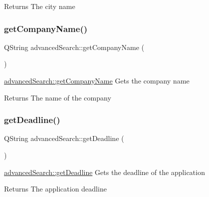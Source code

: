\begin{DoxyReturn}{Returns}
The city name 
\end{DoxyReturn}
\mbox{\label{classadvanced_search_a5e9e9e24e83f36f9ed32bd60cecbb7de}} 
\subsubsection{\texorpdfstring{get\+Company\+Name()}{getCompanyName()}}
{\footnotesize\ttfamily Q\+String advanced\+Search\+::get\+Company\+Name (\begin{DoxyParamCaption}{ }\end{DoxyParamCaption})}



\mbox{\hyperlink{classadvanced_search_a5e9e9e24e83f36f9ed32bd60cecbb7de}{advanced\+Search\+::get\+Company\+Name}} Gets the company name 

\begin{DoxyReturn}{Returns}
The name of the company 
\end{DoxyReturn}
\mbox{\label{classadvanced_search_ae58a90dea341fa431df72e368b70267e}} 
\subsubsection{\texorpdfstring{get\+Deadline()}{getDeadline()}}
{\footnotesize\ttfamily Q\+String advanced\+Search\+::get\+Deadline (\begin{DoxyParamCaption}{ }\end{DoxyParamCaption})}



\mbox{\hyperlink{classadvanced_search_ae58a90dea341fa431df72e368b70267e}{advanced\+Search\+::get\+Deadline}} Gets the deadline of the application 

\begin{DoxyReturn}{Returns}
The application deadline 
\end{DoxyReturn}
\mbox{\label{classadvanced_search_a7bcbaf1e2663396daacf9b033c34238a}} 
